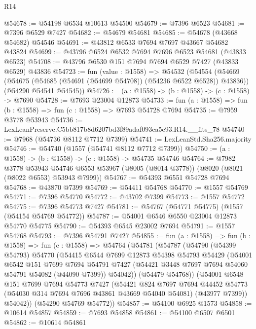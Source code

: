 \begin{lexlean}{R14}
\begin{coremodule}
@54678 := @54198 @6534 @10613 @54500
@54679 := @7396 @6523
@54681 := @7396 @6529 @7427
@54682 := @54679 @54681
@54685 := @54678 (@43668 @54682) @54546
@54691 := @43812 @6533 @7694 @7697 @43667 @54682 @43824
@54699 := @43796 @6524 @6532 @7694 @7696 @6523 @54681 (@43833 @6523)
@54708 := @43796 @6530 @151 @7694 @7694 @6529 @7427 (@43833 @6529) @43836
@54723 := fun (value : @1558) =>
  @54532
    (@54554
      (@54669 (@54675 (@54685 (@54691 (@54699 @54708)) (@54236 @6522 @6528)) @43836))
      (@54290 @54541 @54545))
@54726 := (a : @1558) -> (b : @1558) -> (c : @1558) -> @7690
@54728 := @7693 @23004 @12873
@54733 := fun (a : @1558) => fun (b : @1558) => fun (c : @1558) => @7693 @54728 @7694
@54735 := @7959 @3778 @53943
@54736 := LexLeanPreserve.C5bb817b8d6207bd3f89adaf093ca5e93.R14.__fits_78
@54740 := @7968 (@54736 @8112 @7712 @7399)
@54741 := LexLeanStd.Sha256.majority
@54746 := @54740 (@1557 (@54741 @8112 @7712 @7399))
@54750 := (a : @1558) -> (b : @1558) -> (c : @1558) -> @54735 @54746
@54764 := @7982
    @3778
    @53943
    @54746
    @6553
    @53967
    (@8005 (@8014 @3778))
    (@8020 (@8021 (@8022 @6553) @53943 @7999))
@54767 := @54393 @6551 @54728 @7694
@54768 := @43870 @7399
@54769 := @54411 @54768
@54770 := @1557 @54769
@54771 := @7396 @54770
@54772 := @43702 @7399
@54773 := @1557 @54772
@54775 := @7396 @54773 @7427
@54781 := @54767 (@54771 @54775) (@1557 (@54154 @54769 @54772))
@54787 := @54001 @6546 @6550 @23004 @12873 @54770 @54775
@54790 := @54393 @6545 @23002 @7694
@54791 := @1557 @54768
@54793 := @7396 @54791 @7427
@54855 := fun (a : @1558) =>
  fun (b : @1558) =>
  fun (c : @1558) =>
  @54764
    (@54781
      (@54787
        (@54790
          (@54399 @54793)
          @54770
          (@54415
            @6544
            @7699
            @12873
            @54398
            @54793
            @54429
            (@54001
              @6542
              @151
              @7699
              @7694
              @54791
              @7427
              (@54421 @3448 @7697 @7694 @54060 @54791 @54082 (@44090 @7399))
              @54042))
          (@54479 @54768))
        (@54001
          @6548
          @151
          @7699
          @7694
          @54773
          @7427
          (@54421
            @824
            @7697
            @7694
            @44452
            @54773
            (@54030 @314 @7694 @7696 @43861 @43669 @54040 @54081)
            (@43977 @7399))
          @54042))
      (@54290 @54769 @54772))
@54857 := @54100 @6925 @1573
@54858 := @10614 @54857
@54859 := @7693 @54858
@54861 := @54100 @6507 @6501
@54862 := @10614 @54861

\end{coremodule}
\end{lexlean}
